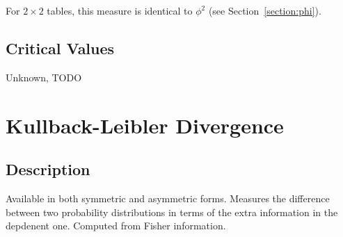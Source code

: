 \documentclass[11pt]{article}
\begin{document}
For $2\times 2$ tables, this measure is identical to $\phi^2$ (see Section~\ref{section:phi}).

\subsection{Critical Values}
Unknown, TODO







\section{Kullback-Leibler Divergence}
\subsection{Description}
Available in both symmetric and asymmetric forms.  Measures the difference between two probability distributions in terms of the extra information in the depdenent one.  Computed from Fisher information.  

\end{document}
